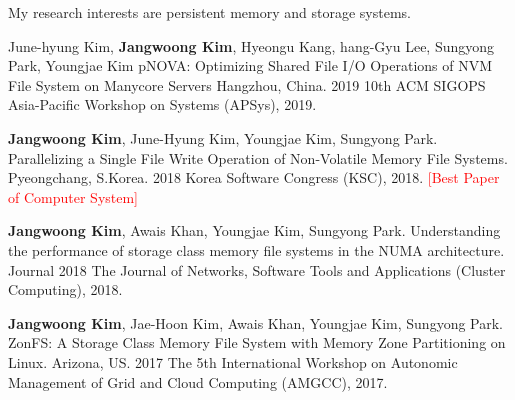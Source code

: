 

  My research interests are persistent memory and storage systems.\\
\begin{cventries}


  \cventry
    {June-hyung Kim, \textbf{Jangwoong Kim}, Hyeongu Kang, hang-Gyu Lee, Sungyong Park, Youngjae Kim} %
    {pNOVA: Optimizing Shared File I/O Operations of NVM File System on Manycore Servers} %
    {Hangzhou, China.} %
    {2019} %
    {
      10th ACM SIGOPS Asia-Pacific Workshop on Systems (APSys), 2019.
    }

  \cventry
	{\textbf{Jangwoong Kim}, June-Hyung Kim, Youngjae Kim,  Sungyong Park.}
	{Parallelizing a Single File Write Operation of Non-Volatile Memory File Systems.}
	{Pyeongchang, S.Korea.}
	{2018}
	{
		Korea Software Congress (KSC), 2018. \textcolor{red}{[Best Paper of Computer System]}
	}

  \cventry
	{\textbf{Jangwoong Kim},  Awais Khan,  Youngjae Kim,  Sungyong Park.}
	{Understanding the performance of storage class memory file systems in the NUMA architecture.}
	{Journal}
	{2018}
	{
		The Journal of Networks, Software Tools and Applications (Cluster Computing), 2018.
	}

  \cventry
	{\textbf{Jangwoong Kim}, Jae-Hoon Kim,  Awais Khan,  Youngjae Kim,  Sungyong Park.}
	{ZonFS: A Storage Class Memory File System with Memory Zone Partitioning on Linux.}
	{Arizona, US.}
	{2017}
	{
		The 5th International Workshop on Autonomic Management of Grid and Cloud Computing (AMGCC), 2017.
	}


\end{cventries}

\clearpage

